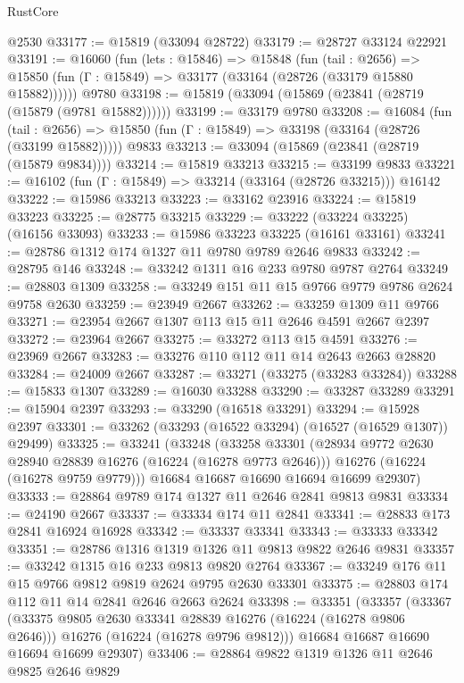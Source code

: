 \begin{lexlean}{RustCore}
\begin{coremodule}
    @2530
@33177 := @15819 (@33094 @28722)
@33179 := @28727 @33124 @22921
@33191 := @16060
    (fun (lets : @15846) =>
    @15848
      (fun (tail : @2656) =>
      @15850 (fun (Γ : @15849) => @33177 (@33164 (@28726 (@33179 @15880 @15882))))))
    @9780
@33198 := @15819 (@33094 (@15869 (@23841 (@28719 (@15879 (@9781 @15882))))))
@33199 := @33179 @9780
@33208 := @16084
    (fun (tail : @2656) => @15850 (fun (Γ : @15849) => @33198 (@33164 (@28726 (@33199 @15882)))))
    @9833
@33213 := @33094 (@15869 (@23841 (@28719 (@15879 @9834))))
@33214 := @15819 @33213
@33215 := @33199 @9833
@33221 := @16102 (fun (Γ : @15849) => @33214 (@33164 (@28726 @33215))) @16142
@33222 := @15986 @33213
@33223 := @33162 @23916
@33224 := @15819 @33223
@33225 := @28775 @33215
@33229 := @33222 (@33224 @33225) (@16156 @33093)
@33233 := @15986 @33223 @33225 (@16161 @33161)
@33241 := @28786 @1312 @174 @1327 @11 @9780 @9789 @2646 @9833
@33242 := @28795 @146
@33248 := @33242 @1311 @16 @233 @9780 @9787 @2764
@33249 := @28803 @1309
@33258 := @33249 @151 @11 @15 @9766 @9779 @9786 @2624 @9758 @2630
@33259 := @23949 @2667
@33262 := @33259 @1309 @11 @9766
@33271 := @23954 @2667 @1307 @113 @15 @11 @2646 @4591 @2667 @2397
@33272 := @23964 @2667
@33275 := @33272 @113 @15 @4591
@33276 := @23969 @2667
@33283 := @33276 @110 @112 @11 @14 @2643 @2663 @28820
@33284 := @24009 @2667
@33287 := @33271 (@33275 (@33283 @33284))
@33288 := @15833 @1307
@33289 := @16030 @33288
@33290 := @33287 @33289
@33291 := @15904 @2397
@33293 := @33290 (@16518 @33291)
@33294 := @15928 @2397
@33301 := @33262 (@33293 (@16522 @33294) (@16527 (@16529 @1307)) @29499)
@33325 := @33241
    (@33248
      (@33258
        @33301
        (@28934 @9772 @2630 @28940 @28839 @16276 (@16224 (@16278 @9773 @2646)))
        @16276
        (@16224 (@16278 @9759 @9779)))
      @16684
      @16687
      @16690
      @16694
      @16699
      @29307)
@33333 := @28864 @9789 @174 @1327 @11 @2646 @2841 @9813 @9831
@33334 := @24190 @2667
@33337 := @33334 @174 @11 @2841
@33341 := @28833 @173 @2841 @16924 @16928
@33342 := @33337 @33341
@33343 := @33333 @33342
@33351 := @28786 @1316 @1319 @1326 @11 @9813 @9822 @2646 @9831
@33357 := @33242 @1315 @16 @233 @9813 @9820 @2764
@33367 := @33249 @176 @11 @15 @9766 @9812 @9819 @2624 @9795 @2630 @33301
@33375 := @28803 @174 @112 @11 @14 @2841 @2646 @2663 @2624
@33398 := @33351
    (@33357
      (@33367
        (@33375 @9805 @2630 @33341 @28839 @16276 (@16224 (@16278 @9806 @2646)))
        @16276
        (@16224 (@16278 @9796 @9812)))
      @16684
      @16687
      @16690
      @16694
      @16699
      @29307)
@33406 := @28864 @9822 @1319 @1326 @11 @2646 @9825 @2646 @9829

\end{coremodule}
\end{lexlean}
